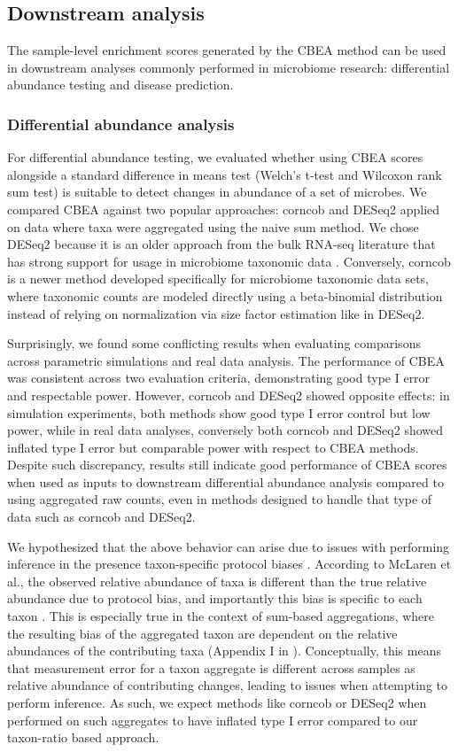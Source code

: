 \documentclass[10pt,letterpaper]{article}
\begin{document}
\subsection*{Downstream analysis}
The sample-level enrichment scores generated by the CBEA method can be used in downstream analyses commonly performed in microbiome research: differential abundance testing and disease prediction.

\subsubsection*{Differential abundance analysis}
For differential abundance testing, we evaluated whether using CBEA scores alongside a standard difference in means test (Welch's t-test and Wilcoxon rank sum test) is suitable to detect changes in abundance of a set of microbes. We compared CBEA against two popular approaches: corncob \cite{martin2020} and DESeq2 \cite{love2014} applied on data where taxa were aggregated using the naive sum method. We chose DESeq2 because it is an older approach from the bulk RNA-seq literature that has strong support for usage in microbiome taxonomic data \cite{mcmurdie2014}. Conversely, corncob is a newer method developed specifically for microbiome taxonomic data sets, where taxonomic counts are modeled directly using a beta-binomial distribution instead of relying on normalization via size factor estimation like in DESeq2. 

Surprisingly, we found some conflicting results when evaluating comparisons across parametric simulations and real data analysis. The performance of CBEA was consistent across two evaluation criteria, demonstrating good type I error and respectable power. However, corncob and DESeq2 showed opposite effects: in simulation experiments, both methods show good type I error control but low power, while in real data analyses, conversely both corncob and DESeq2 showed inflated type I error but comparable power with respect to CBEA methods. Despite such discrepancy, results still indicate good performance of CBEA scores when used as inputs to downstream differential abundance analysis compared to using aggregated raw counts, even in methods designed to handle that type of data such as corncob and DESeq2.

We hypothesized that the above behavior can arise due to issues with performing inference in the presence taxon-specific protocol biases \cite{mclaren2019}. According to McLaren et al., the observed relative abundance of taxa is different than the true relative abundance due to protocol bias, and importantly this bias is specific to each taxon \cite{mclaren2019}. This is especially true in the context of sum-based aggregations, where the resulting bias of the aggregated taxon are dependent on the relative abundances of the contributing taxa (Appendix I in \cite{mclaren2019}). Conceptually, this means that measurement error for a taxon aggregate is different across samples as relative abundance of contributing changes, leading to issues when attempting to perform inference. As such, we expect methods like corncob or DESeq2 when performed on such aggregates to have inflated type I error compared to our taxon-ratio based approach.  
\end{document}

